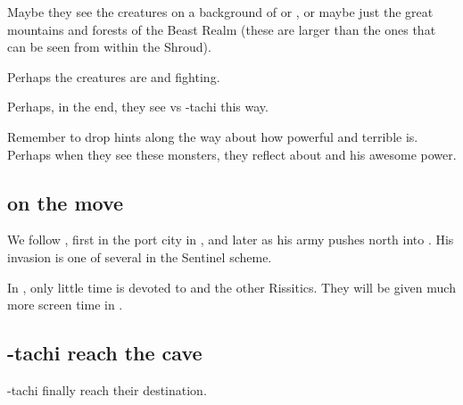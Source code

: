 Maybe they see the creatures on a background of \Nyx{} or \Machai{}, or maybe just the great mountains and forests of the Beast Realm (these are larger than the ones that can be seen from within the Shroud). 

Perhaps the creatures are \dragons{} and \banes{} fighting. 

Perhaps, in the end, they see \Ishnaruchaefir{} vs \Teshrial-tachi this way. 

Remember to drop hints along the way about how powerful and terrible \Ishnaruchaefir{} is. Perhaps when they see these monsters, they reflect about \Ishnaruchaefir{} and his awesome power. 







\subsection{\Narkiza{} on the move}

We follow \Narkiza{}, first in the port city in \Scyrum, and later as his army pushes north into \Velcad{}. His invasion is one of several  in the Sentinel scheme.

In \TwilightAngelRememberEmph, only little time is devoted to \Narkiza{} and the other Rissitics. They will be given much more screen time in \emph{\CarzainWithRedcorBook}. 













\subsection{\Shilred-tachi reach the cave}
\Shilred-tachi finally reach their destination. 





